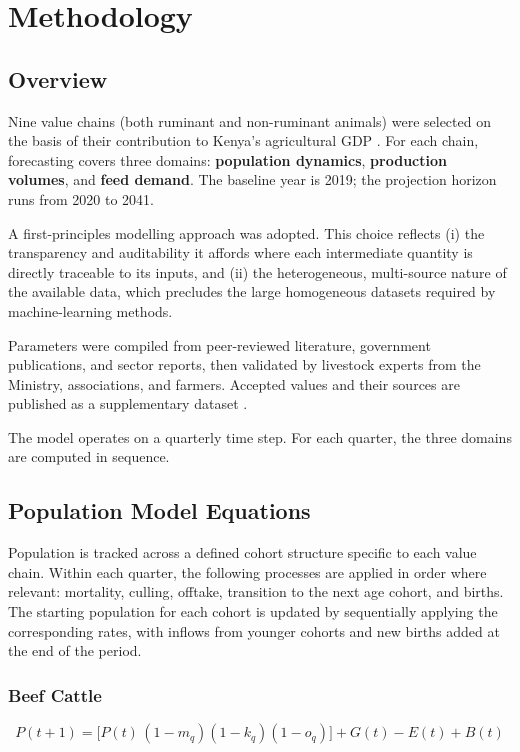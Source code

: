 \section{Methodology}

\subsection{Overview}

Nine value chains (both ruminant and non-ruminant animals) were selected on the basis of their contribution to Kenya's agricultural GDP \citep{behnke2011}.
For each chain, forecasting covers three domains: \textbf{population dynamics}, \textbf{production volumes}, and \textbf{feed demand}. The baseline year is 2019; the projection horizon runs from 2020 to 2041.

A first-principles modelling approach was adopted. This choice reflects (i) the transparency and auditability it affords where each intermediate quantity is directly traceable to its inputs, and (ii) the heterogeneous, multi-source nature of the available data, which precludes the large homogeneous datasets required by machine-learning methods.

Parameters were compiled from peer-reviewed literature, government publications, and sector reports, then validated by livestock experts from the Ministry, associations, and farmers. Accepted values and their sources are published as a supplementary dataset \citep{DVN/K9GXOP_2026}.

The model operates on a quarterly time step. For each quarter, the three domains are computed in sequence.

\subsection{Population Model Equations}
Population is tracked across a defined cohort structure specific to each value chain. Within each quarter, the following processes are applied in order where relevant: mortality, culling, offtake, transition to the next age cohort, and births. The starting population for each cohort is updated by sequentially applying the corresponding rates, with inflows from younger cohorts and new births added at the end of the period.

\subsubsection{Beef Cattle}
\begin{equation}
P(t+1) = \bigl[P(t)\,(1 - m_q)(1 - k_q)(1 - o_q)\bigr] + G(t) - E(t) + B(t)
\end{equation}

